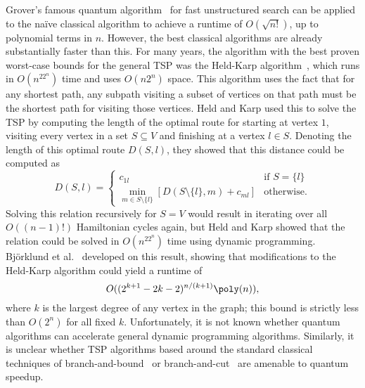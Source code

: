 Grover's famous quantum algorithm~\cite{grover96} for fast unstructured search can be applied to the na\"ive classical algorithm to achieve a runtime of $O(\sqrt{n!})$, up to polynomial terms in $n$. However, the best classical algorithms are already substantially faster than this. For many years, the algorithm with the best proven worst-case bounds for the general TSP was the Held-Karp algorithm~\cite{held1962}, which runs in $O(n^22^n)$ time and uses $O(n2^n)$ space. This algorithm uses the fact that for any shortest path, any subpath visiting a subset of vertices on that path must be the shortest path for visiting those vertices. Held and Karp used this to solve the TSP by computing the length of the optimal route for starting at vertex $1$, visiting every vertex in a set $S \subseteq V$ and finishing at a vertex $l \in S$. Denoting the length of this optimal route $D(S, l)$, they showed that this distance could be computed as
%
\begin{equation}
D(S, l) = \begin{cases} c_{1l} & \text{if } S = \{l\}\\
          \min_{m \in S \setminus \{l\}}\left[D(S \setminus \{l\}, m) + c_{ml}\right] & \text{otherwise.}
  \end{cases}
\end{equation}
%
Solving this relation recursively for $S=V$ would result in iterating over all $O((n-1)!)$ Hamiltonian cycles again, but Held and Karp showed that the relation could be solved in $O(n^22^n)$ time using dynamic programming. Bj{\"o}rklund et al.\ \cite{bjorklund2008} developed on this result, showing that modifications to the Held-Karp algorithm could yield a runtime of
%
\begin{equation}
O((2^{k + 1} - 2k - 2)^{n/(k + 1)}\poly(n)),
\end{equation}
%
where $k$ is the largest degree of any vertex in the graph; this bound is strictly less than $O(2^n)$ for all fixed $k$. Unfortunately, it is not known whether quantum algorithms can accelerate general dynamic programming algorithms. Similarly, it is unclear whether TSP algorithms based around the standard classical techniques of branch-and-bound~\cite{little1963} or branch-and-cut~\cite{padberg1991} are amenable to quantum speedup.



